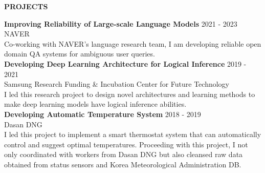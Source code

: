 \documentclass[12pt]{article}
\begin{document}







\begin{center}
	{\noindent \bfseries PROJECTS}
    \noindent\makebox[\linewidth]{\rule{0.75\paperwidth}{0.4pt}}
\end{center}

\noindent
{\bfseries Improving Reliability of Large-scale Language Models} \hfill 2021 - 2023 \\ 
\noindent 
NAVER \\
Co-working with NAVER's language research team, I am developing reliable open domain QA systems for ambiguous user queries.
\\ 

\noindent
{\bfseries Developing Deep Learning Architecture for Logical Inference} \hfill 2019 - 2021\\ 
\noindent 
Samsung Research Funding \& Incubation Center for Future Technology \\
I led this research project to design novel architectures and learning methods to make deep learning models have logical inference abilities.
\\ 

\noindent
{\bfseries Developing Automatic Temperature System} \hfill 2018 - 2019 \\ 
\noindent 
Dasan DNG\\
I led this project to implement a smart thermostat system that can automatically control and suggest optimal temperatures.
Proceeding with this project, I not only coordinated with workers from Dasan DNG but also cleansed raw data obtained from status sensors and Korea Meteorological Administration DB.\\
\end{document}
